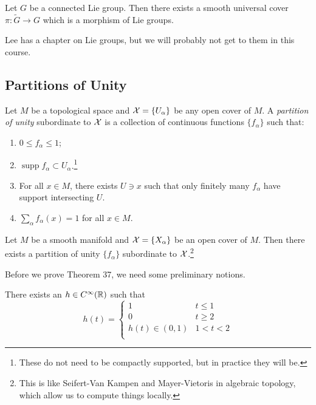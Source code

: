\documentclass[twoside, 10pt]{article}
\begin{document}
    \begin{thm}
        Let $G$ be a connected Lie group. Then there exists a smooth universal cover $\pi: \widetilde{G} \to G$ which is a morphism of Lie groups.
    \end{thm}

    \begin{rmk}
        Lee has a chapter on Lie groups, but we will probably not get to them in this course.
    \end{rmk}

    \subsection{Partitions of Unity}%
    \label{sub:partitions_of_unity}
    
    

    \begin{defn}
        Let $M$ be a topological space and $\mathcal{X} = \{U_{\alpha}\}$ be any open cover of $M$. A \textit{partition of unity} subordinate to $\mathcal{X}$ is a collection of continuous functions $\{f_{\alpha}\}$ such that:
        \begin{enumerate}
            \item $0 \leq f_{\alpha} \leq 1$;
            \item $\operatorname{supp} f_{\alpha} \subset U_{\alpha}$.\footnote{These do not need to be compactly supported, but in practice they will be.}
            \item For all $x \in M$, there exists $U \ni x$ such that only finitely many $f_{\alpha}$ have support intersecting $U$.
            \item $\sum_{\alpha} f_{\alpha}(x) = 1$ for all $x \in M$.
        \end{enumerate}
    \end{defn}

    \begin{thm}
        Let $M$ be a smooth manifold and $\mathcal{X} = \{X_{\alpha}\}$ be an open cover of $M$. Then there exists a partition of unity $\{f_{\alpha}\}$ subordinate to $\mathcal{X}$.\footnote{This is like Seifert-Van Kampen and Mayer-Vietoris in algebraic topology, which allow us to compute things locally.}
    \end{thm}

    Before we prove Theorem 37, we need some preliminary notions.

    \begin{lem}
        There exists an $h \in C^{\infty}(\mathbb{R})$ such that 
        \[h(t) = \begin{cases}
            1 & t \leq 1 \\
            0 & t \geq 2 \\
            h(t) \in (0,1) & 1 < t < 2 \\
        \end{cases} \]
    \end{lem}
\end{document}
